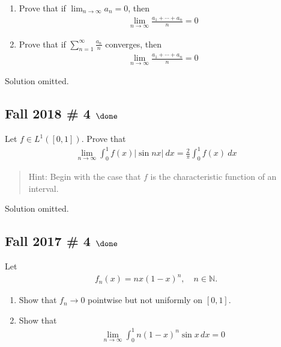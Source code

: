 \begin{enumerate}
\def\labelenumi{\alph{enumi}.}
\item
  Prove that if \(\displaystyle\lim_{n\to \infty } a_n = 0\), then
  \begin{align*}
  \lim _{n \rightarrow \infty} \frac{a_{1}+\cdots+a_{n}}{n}=0
  \end{align*}
\item
  Prove that if \(\displaystyle\sum_{n=1}^{\infty} \frac{a_{n}}{n}\)
  converges, then
  \begin{align*}
  \lim _{n \rightarrow \infty} \frac{a_{1}+\cdots+a_{n}}{n}=0
  \end{align*}
\end{enumerate}

Solution omitted.

\hypertarget{fall-2018-4-done}{%
\subsection{\texorpdfstring{Fall 2018 \# 4
\(\done\)}{Fall 2018 \# 4 \textbackslash done}}\label{fall-2018-4-done}}

Let \(f\in L^1([0, 1])\). Prove that
\begin{align*}
\lim_{n \to \infty} \int_{0}^{1} f(x) {\left\lvert {\sin n x} \right\rvert} ~d x= \frac{2}{\pi} \int_{0}^{1} f(x) ~d x
\end{align*}

\begin{quote}
Hint: Begin with the case that \(f\) is the characteristic function of
an interval.
\end{quote}


Solution omitted.

\hypertarget{fall-2017-4-done}{%
\subsection{\texorpdfstring{Fall 2017 \# 4
\(\done\)}{Fall 2017 \# 4 \textbackslash done}}\label{fall-2017-4-done}}

Let
\begin{align*}
f_{n}(x) = n x(1-x)^{n}, \quad n \in {\mathbb{N}}.
\end{align*}

\begin{enumerate}
\def\labelenumi{\alph{enumi}.}
\item
  Show that \(f_n \to 0\) pointwise but not uniformly on \([0, 1]\).
\item
  Show that
  \begin{align*}
  \lim _{n \to \infty} \int _{0}^{1} n(1-x)^{n} \sin x \, dx = 0
  \end{align*}
\end{enumerate}

